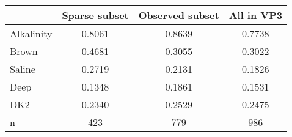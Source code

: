 \begin{tabular}{lccc}
\toprule
 & Sparse subset & Observed subset & All in VP3 \\
\midrule
Alkalinity & 0.8061 & 0.8639 & 0.7738 \\
Brown & 0.4681 & 0.3055 & 0.3022 \\
Saline & 0.2719 & 0.2131 & 0.1826 \\
Deep & 0.1348 & 0.1861 & 0.1531 \\
DK2 & 0.2340 & 0.2529 & 0.2475 \\
n & 423 & 779 & 986 \\
\bottomrule
\end{tabular}

